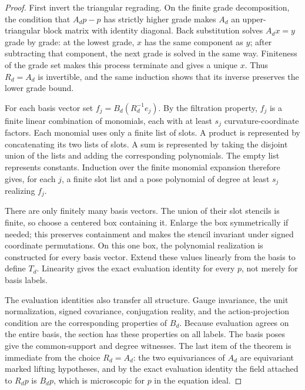 \begin{proof}
First invert the triangular regrading. On the finite grade decomposition,
the condition that $A_dp-p$ has strictly higher grade makes $A_d$ an
upper-triangular block matrix with identity diagonal. Back substitution
solves $A_dx=y$ grade by grade: at the lowest grade, $x$ has the same
component as $y$; after subtracting that component, the next grade is
solved in the same way. Finiteness of the grade set makes this process
terminate and gives a unique $x$. Thus $R_d=A_d$ is invertible, and the
same induction shows that its inverse preserves the lower grade bound.

For each basis vector set $f_j=B_d(R_d^{-1}e_j)$. By the filtration
property, $f_j$ is a finite linear combination of monomials, each with at
least $s_j$ curvature-coordinate factors. Each monomial uses only a
finite list of slots. A product is represented by concatenating its two
lists of slots. A sum is represented
by taking the disjoint union of the lists and adding the corresponding
polynomials. The empty list represents constants. Induction over the
finite monomial expansion therefore gives, for each $j$, a finite slot
list and a pose polynomial of degree at least $s_j$ realizing $f_j$.

There are only finitely many basis vectors. The union of their slot
stencils is finite, so choose a centered box containing it. Enlarge the
box symmetrically if needed; this preserves containment and makes the
stencil invariant under signed coordinate permutations. On this one box,
the polynomial realization is constructed for every basis vector. Extend
these values linearly from the basis to define $T_d$. Linearity gives the
exact evaluation identity for every $p$, not merely for basis labels.

The evaluation identities also transfer all structure. Gauge invariance,
the unit normalization, signed covariance, conjugation reality, and the
action-projection condition are the corresponding properties of $B_d$.
Because evaluation agrees on the entire basis, the section has these
properties on all labels. The basis poses give the common-support and
degree witnesses. The last item of the theorem is immediate from the
choice $R_d=A_d$: the two equivariances of $A_d$ are equivariant marked lifting hypotheses,
and by the exact evaluation identity the field attached to $R_dp$ is
$B_dp$, which is microscopic for $p$ in the equation ideal.


\end{proof}
